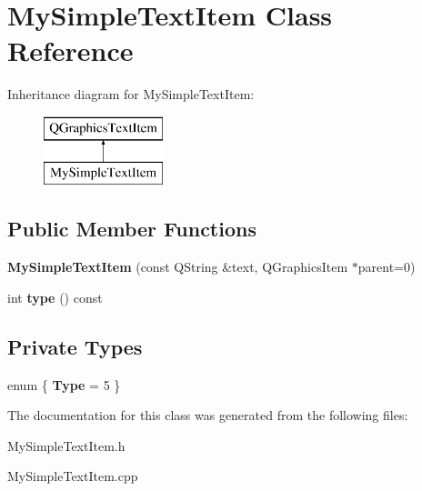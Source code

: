 \hypertarget{class_my_simple_text_item}{}\section{My\+Simple\+Text\+Item Class Reference}
\label{class_my_simple_text_item}
Inheritance diagram for My\+Simple\+Text\+Item\+:\begin{figure}[H]
\begin{center}
\leavevmode
\includegraphics[height=2.000000cm]{class_my_simple_text_item}
\end{center}
\end{figure}
\subsection*{Public Member Functions}
\begin{DoxyCompactItemize}
\item 
\hypertarget{class_my_simple_text_item_abcb188d82eae8c094d053c30f414e5f7}{}{\bfseries My\+Simple\+Text\+Item} (const Q\+String \&text, Q\+Graphics\+Item $\ast$parent=0)\label{class_my_simple_text_item_abcb188d82eae8c094d053c30f414e5f7}

\item 
\hypertarget{class_my_simple_text_item_acdb1382024e54a67c89b887b5ec67f47}{}int {\bfseries type} () const \label{class_my_simple_text_item_acdb1382024e54a67c89b887b5ec67f47}

\end{DoxyCompactItemize}
\subsection*{Private Types}
\begin{DoxyCompactItemize}
\item 
\hypertarget{class_my_simple_text_item_a6483b53c725f5e46bc9e9ba16ee909e3}{}enum \{ {\bfseries Type} = 5
 \}\label{class_my_simple_text_item_a6483b53c725f5e46bc9e9ba16ee909e3}

\end{DoxyCompactItemize}


The documentation for this class was generated from the following files\+:\begin{DoxyCompactItemize}
\item 
My\+Simple\+Text\+Item.\+h\item 
My\+Simple\+Text\+Item.\+cpp\end{DoxyCompactItemize}
